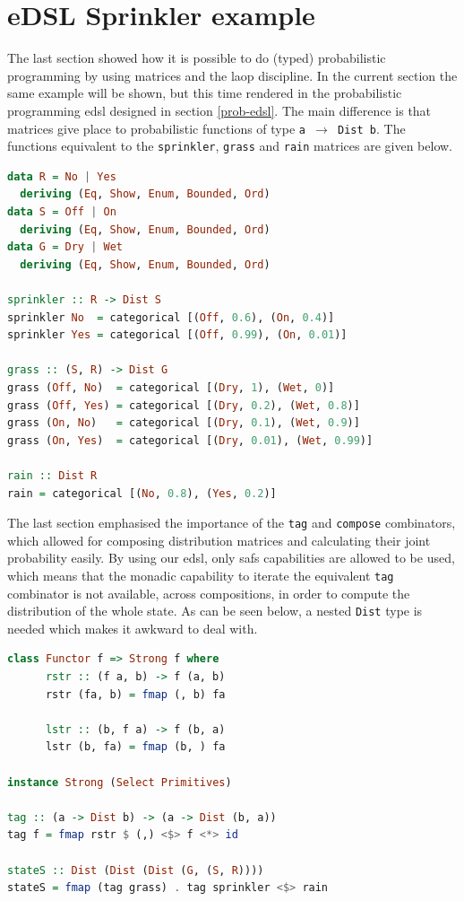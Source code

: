 \documentclass[
  oneside,
  11pt, a4paper,
  footinclude=true,
  headinclude=true,
  cleardoublepage=empty
]{scrbook}
\theoremstyle{definition}
\theoremstyle{definition}
\begin{document}
        \section{eDSL Sprinkler example}
        
        The last section showed how it is possible to do (typed) probabilistic programming by using matrices and the \gls{laop} discipline. In the current section the same example will be shown, but this time rendered in the probabilistic programming \gls{edsl} designed in section \ref{prob-edsl}. The main difference is that matrices give place to probabilistic functions of type \texttt{a $\to$ Dist b}. The functions equivalent to the \texttt{sprinkler}, \texttt{grass} and \texttt{rain} matrices are given below.
        
        \begin{lstlisting}[language=Haskell, caption={Example probabilistic functions}, captionpos=b]
data R = No | Yes
  deriving (Eq, Show, Enum, Bounded, Ord)
data S = Off | On
  deriving (Eq, Show, Enum, Bounded, Ord)
data G = Dry | Wet
  deriving (Eq, Show, Enum, Bounded, Ord)

sprinkler :: R -> Dist S
sprinkler No  = categorical [(Off, 0.6), (On, 0.4)]
sprinkler Yes = categorical [(Off, 0.99), (On, 0.01)]

grass :: (S, R) -> Dist G
grass (Off, No)  = categorical [(Dry, 1), (Wet, 0)]
grass (Off, Yes) = categorical [(Dry, 0.2), (Wet, 0.8)]
grass (On, No)   = categorical [(Dry, 0.1), (Wet, 0.9)]
grass (On, Yes)  = categorical [(Dry, 0.01), (Wet, 0.99)]

rain :: Dist R
rain = categorical [(No, 0.8), (Yes, 0.2)]
        \end{lstlisting}{}
        
        The last section emphasised the importance of the \texttt{tag} and \texttt{compose} combinators, which  allowed for composing distribution matrices and calculating their joint probability easily. By using our \gls{edsl}, only \glspl{saf} capabilities are allowed to be used, which means that the monadic capability to iterate the equivalent \texttt{tag} combinator is not available, across compositions, in order to compute the distribution of the whole state. As can be seen below, a nested \texttt{Dist} type is needed which makes it awkward to deal with.
        
        \begin{lstlisting}[language=Haskell, caption={\texttt{tag} combinator}, captionpos=b]
class Functor f => Strong f where
      rstr :: (f a, b) -> f (a, b)
      rstr (fa, b) = fmap (, b) fa

      lstr :: (b, f a) -> f (b, a)
      lstr (b, fa) = fmap (b, ) fa

instance Strong (Select Primitives)
 
tag :: (a -> Dist b) -> (a -> Dist (b, a))
tag f = fmap rstr $ (,) <$> f <*> id

stateS :: Dist (Dist (Dist (G, (S, R))))
stateS = fmap (tag grass) . tag sprinkler <$> rain
        \end{lstlisting}{}
        
\end{document}
